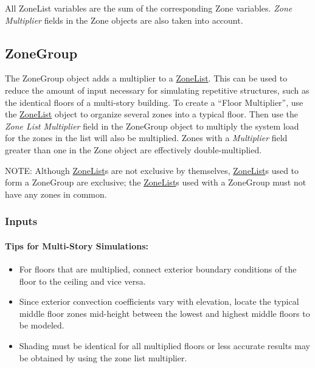 All ZoneList variables are the sum of the corresponding Zone variables. \emph{Zone Multiplier} fields in the Zone objects are also taken into account.

\subsection{ZoneGroup}\label{zonegroup}

The ZoneGroup object adds a multiplier to a \hyperref[zonelist]{ZoneList}. This can be used to reduce the amount of input necessary for simulating repetitive structures, such as the identical floors of a multi-story building. To create a ``Floor Multiplier'', use the \hyperref[zonelist]{ZoneList} object to organize several zones into a typical floor. Then use the \emph{Zone List Multiplier} field in the ZoneGroup object to multiply the system load for the zones in the list will also be multiplied. Zones with a \emph{Multiplier} field greater than one in the Zone object are effectively double-multiplied.

\begin{callout}
NOTE: Although \hyperref[zonelist]{ZoneList}s are not exclusive by themselves, \hyperref[zonelist]{ZoneList}s used to form a ZoneGroup are exclusive; the \hyperref[zonelist]{ZoneList}s used with a ZoneGroup must not have any zones in common.
\end{callout}

\subsubsection{Inputs}\label{inputs-2-042}

\paragraph{Tips for Multi-Story Simulations:}\label{tips-for-multi-story-simulations}

\begin{itemize}
\item
  For floors that are multiplied, connect exterior boundary conditions of the floor to the ceiling and vice versa.
\item
  Since exterior convection coefficients vary with elevation, locate the typical middle floor zones mid-height between the lowest and highest middle floors to be modeled.
\item
  Shading must be identical for all multiplied floors or less accurate results may be obtained by using the zone list multiplier.
\end{itemize}

